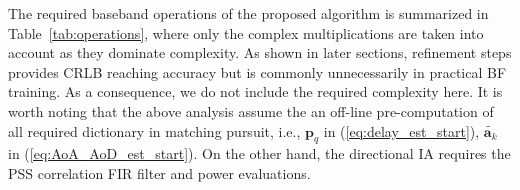 \documentclass[journal]{IEEEtran}
\newcommand{\TSS}[0]{T_{\text{F}}}
\newcommand{\Gr}[0]{G_{\text{R}}}
\newcommand{\Gt}[0]{G_{\text{T}}}
\newcommand{\Gd}[0]{G_{\text{D}}}
\begin{document}



The required baseband operations of the proposed algorithm is summarized in Table~\ref{tab:operations}, where only the complex multiplications are taken into account as they dominate complexity. 
As shown in later sections, refinement steps provides CRLB reaching accuracy but is commonly unnecessarily in practical BF training. As a consequence, we do not include the required complexity here. It is worth noting that the above analysis assume the an off-line pre-computation of all required dictionary in matching pursuit, i.e., $\mathbf{p}_q$ in (\ref{eq:delay_est_start}), $\tilde{\mathbf{a}_k}$ in (\ref{eq:AoA_AoD_est_start}). On the other hand, the directional IA requires the PSS correlation FIR filter and power evaluations. 
\end{document}
